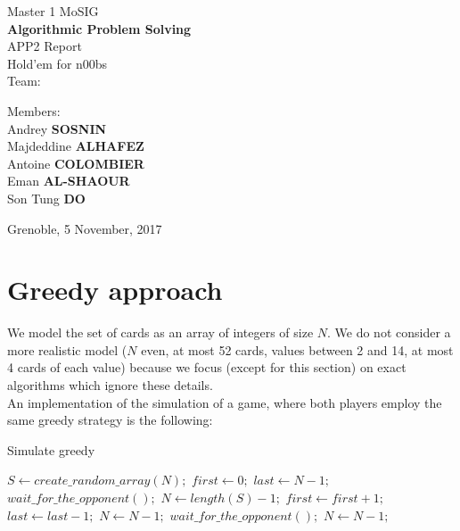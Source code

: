 \documentclass{article}
\begin{document}
\begin{titlepage}
\begin{center}

\vspace*{5cm}
{\large Master 1 MoSIG}\\[0.5cm]

{\Huge \textbf{Algorithmic Problem Solving} }\\[0.5cm]
{\large APP2 Report} \\
Hold'em for n00bs\\ 
Team:%
\vfill

\noindent
\begin{minipage}{0.4\textwidth}

   \centering Members:\\Andrey \textbf{SOSNIN}\\Majdeddine \textbf{ALHAFEZ}\\Antoine \textbf{COLOMBIER}\\Eman \textbf{AL-SHAOUR}\\Son Tung \textbf{DO}\\

\end{minipage}%

\vfill
{Grenoble, 5 November, 2017}
\clearpage


\end{center}
\end{titlepage}
\section{Greedy approach}
We model the set of cards as an array of integers of size $N$. We do not consider a more realistic model ($N$ even, at most 52 cards, values between 2 and 14, at most 4 cards of each value) because we focus (except for this section) on exact algorithms which ignore these details.\\
An implementation of the simulation of a game, where both players employ the same greedy strategy is the following:

\begin{algorithm}[H]
\caption{Simulate greedy}
\begin{algorithmic} 
\State $S \leftarrow create\_random\_array(N);$
\State $first \leftarrow 0;$
\State $last \leftarrow N - 1;$
\State $wait\_for\_the\_opponent();$
\State $N \leftarrow length(S) - 1;$
        \State $first \leftarrow first + 1;$
    \Else
        \State $last \leftarrow last - 1;$
    \EndIf
    \State $N \leftarrow N - 1;$
        \State $wait\_for\_the\_opponent();$
        \State $N \leftarrow N - 1;$
    \EndIf
\EndWhile
\end{algorithmic}
\end{algorithm}
\end{document}
